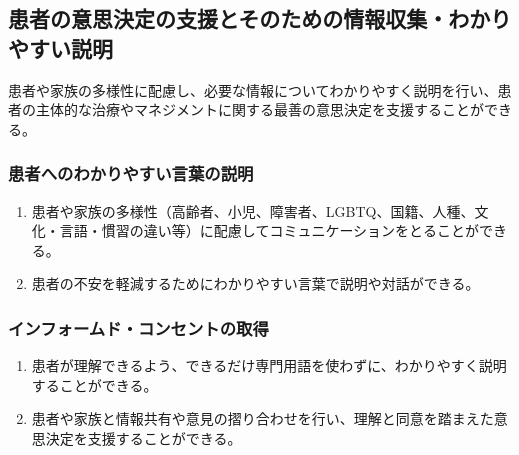 \hypertarget{ux60a3ux8005ux306eux610fux601dux6c7aux5b9aux306eux652fux63f4ux3068ux305dux306eux305fux3081ux306eux60c5ux5831ux53ceux96c6ux308fux304bux308aux3084ux3059ux3044ux8aacux660e}{%
\subsection{患者の意思決定の支援とそのための情報収集・わかりやすい説明}\label{ux60a3ux8005ux306eux610fux601dux6c7aux5b9aux306eux652fux63f4ux3068ux305dux306eux305fux3081ux306eux60c5ux5831ux53ceux96c6ux308fux304bux308aux3084ux3059ux3044ux8aacux660e}}

患者や家族の多様性に配慮し、必要な情報についてわかりやすく説明を行い、患者の主体的な治療やマネジメントに関する最善の意思決定を支援することができる。

\hypertarget{ux60a3ux8005ux3078ux306eux308fux304bux308aux3084ux3059ux3044ux8a00ux8449ux306eux8aacux660e}{%
\subsubsection{患者へのわかりやすい言葉の説明}\label{ux60a3ux8005ux3078ux306eux308fux304bux308aux3084ux3059ux3044ux8a00ux8449ux306eux8aacux660e}}

\begin{enumerate}
\def\labelenumi{\arabic{enumi}.}
\tightlist
\item
  患者や家族の多様性（高齢者、小児、障害者、LGBTQ、国籍、人種、文化・言語・慣習の違い等）に配慮してコミュニケーションをとることができる。
\item
  患者の不安を軽減するためにわかりやすい言葉で説明や対話ができる。
\end{enumerate}

\hypertarget{ux30a4ux30f3ux30d5ux30a9ux30fcux30e0ux30c9ux30b3ux30f3ux30bbux30f3ux30c8ux306eux53d6ux5f97}{%
\subsubsection{インフォームド・コンセントの取得}\label{ux30a4ux30f3ux30d5ux30a9ux30fcux30e0ux30c9ux30b3ux30f3ux30bbux30f3ux30c8ux306eux53d6ux5f97}}

\begin{enumerate}
\def\labelenumi{\arabic{enumi}.}
\tightlist
\item
  患者が理解できるよう、できるだけ専門用語を使わずに、わかりやすく説明することができる。
\item
  患者や家族と情報共有や意見の摺り合わせを行い、理解と同意を踏まえた意思決定を支援することができる。
\end{enumerate}

